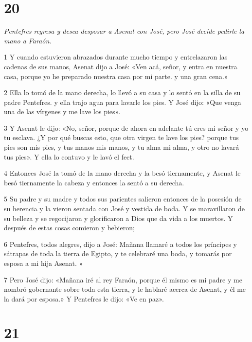 \chapter{20}

\par \textit{Pentefres regresa y desea desposar a Asenat con José, pero José decide pedirle la mano a Faraón.}

\par 1 Y cuando estuvieron abrazados durante mucho tiempo y entrelazaron las cadenas de sus manos, Asenat dijo a José: «Ven acá, señor, y entra en nuestra casa, porque yo he preparado nuestra casa por mi parte. y una gran cena.»

\par 2 Ella lo tomó de la mano derecha, lo llevó a su casa y lo sentó en la silla de su padre Pentefres. y ella trajo agua para lavarle los pies. Y José dijo: «Que venga una de las vírgenes y me lave los pies».

\par 3 Y Asenat le dijo: «No, señor, porque de ahora en adelante tú eres mi señor y yo tu esclava. ¿Y por qué buscas esto, que otra virgen te lave los pies? porque tus pies son mis pies, y tus manos mis manos, y tu alma mi alma, y ​​otro no lavará tus pies». Y ella lo contuvo y le lavó el fect.

\par 4 Entonces José la tomó de la mano derecha y la besó tiernamente, y Asenat le besó tiernamente la cabeza y entonces la sentó a su derecha.

\par 5 Su padre y su madre y todos sus parientes salieron entonces de la posesión de su herencia y la vieron sentada con José y vestida de boda. Y se maravillaron de su belleza y se regocijaron y glorificaron a Dios que da vida a los muertos. Y después de estas cosas comieron y bebieron;

\par 6 Pentefres, todos alegres, dijo a José: Mañana llamaré a todos los príncipes y sátrapas de toda la tierra de Egipto, y te celebraré una boda, y tomarás por esposa a mi hija Asenat. »

\par 7 Pero José dijo: «Mañana iré al rey Faraón, porque él mismo es mi padre y me nombró gobernante sobre toda esta tierra, y le hablaré acerca de Asenat, y él me la dará por esposa.» Y Pentefres le dijo: «Ve en paz».

\chapter{21}

